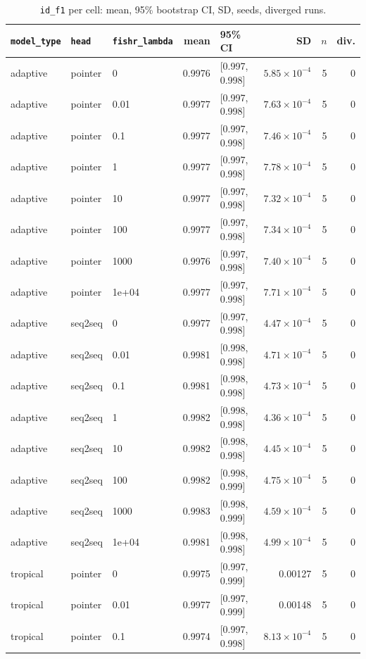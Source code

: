 \documentclass[10pt]{article}
\begin{document}
{\small
\begin{longtable}{lllrlrrr}
\caption{\texttt{id\_f1} per cell: mean, 95\% bootstrap CI, SD, seeds, diverged runs.}\label{tab:summary-id_f1}\\
\toprule
\texttt{model\_type} & \texttt{head} & \texttt{fishr\_lambda} & mean & 95\% CI & SD & $n$ & div.\\
\midrule
\endhead
adaptive & pointer & 0 & 0.9976 & [0.997, 0.998] & $5.85\times10^{-4}$ & 5 & 0\\
adaptive & pointer & 0.01 & 0.9977 & [0.997, 0.998] & $7.63\times10^{-4}$ & 5 & 0\\
adaptive & pointer & 0.1 & 0.9977 & [0.997, 0.998] & $7.46\times10^{-4}$ & 5 & 0\\
adaptive & pointer & 1 & 0.9977 & [0.997, 0.998] & $7.78\times10^{-4}$ & 5 & 0\\
adaptive & pointer & 10 & 0.9977 & [0.997, 0.998] & $7.32\times10^{-4}$ & 5 & 0\\
adaptive & pointer & 100 & 0.9977 & [0.997, 0.998] & $7.34\times10^{-4}$ & 5 & 0\\
adaptive & pointer & 1000 & 0.9976 & [0.997, 0.998] & $7.40\times10^{-4}$ & 5 & 0\\
adaptive & pointer & 1e+04 & 0.9977 & [0.997, 0.998] & $7.71\times10^{-4}$ & 5 & 0\\
adaptive & seq2seq & 0 & 0.9977 & [0.997, 0.998] & $4.47\times10^{-4}$ & 5 & 0\\
adaptive & seq2seq & 0.01 & 0.9981 & [0.998, 0.998] & $4.71\times10^{-4}$ & 5 & 0\\
adaptive & seq2seq & 0.1 & 0.9981 & [0.998, 0.998] & $4.73\times10^{-4}$ & 5 & 0\\
adaptive & seq2seq & 1 & 0.9982 & [0.998, 0.998] & $4.36\times10^{-4}$ & 5 & 0\\
adaptive & seq2seq & 10 & 0.9982 & [0.998, 0.998] & $4.45\times10^{-4}$ & 5 & 0\\
adaptive & seq2seq & 100 & 0.9982 & [0.998, 0.999] & $4.75\times10^{-4}$ & 5 & 0\\
adaptive & seq2seq & 1000 & 0.9983 & [0.998, 0.999] & $4.59\times10^{-4}$ & 5 & 0\\
adaptive & seq2seq & 1e+04 & 0.9981 & [0.998, 0.998] & $4.99\times10^{-4}$ & 5 & 0\\
tropical & pointer & 0 & 0.9975 & [0.997, 0.999] & 0.00127 & 5 & 0\\
tropical & pointer & 0.01 & 0.9977 & [0.997, 0.999] & 0.00148 & 5 & 0\\
tropical & pointer & 0.1 & 0.9974 & [0.997, 0.998] & $8.13\times10^{-4}$ & 5 & 0\\

\end{longtable}}
\end{document}
